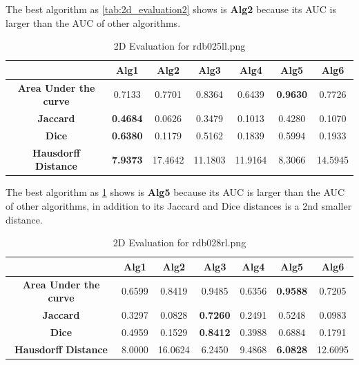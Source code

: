 \documentclass[a4paper, 11pt]{article}
\begin{document}
The best algorithm as \ref{tab:2d_evaluation2} shows is \textbf{Alg2} because its AUC is larger than the AUC of other algorithms.

\begin{table}[h!]
\centering
\begin{tabular}{|c|c|c|c|c|c|c|}
\hline
{} & \textbf{Alg1} & \textbf{Alg2} & \textbf{Alg3} & \textbf{Alg4} & \textbf{Alg5} & \textbf{Alg6} \\
\hline
\textbf{Area Under the curve} & {0.7133} & {0.7701} & {0.8364} & {0.6439} & \textbf{0.9630} & {0.7726} \\
\hline
\textbf{Jaccard} & \textbf{0.4684} & {0.0626} & {0.3479} & {0.1013} & {0.4280} & {0.1070} \\
\hline
\textbf{Dice} & \textbf{0.6380} & {0.1179} & {0.5162} & {0.1839} & {0.5994} & {0.1933} \\
\hline
\textbf{Hausdorff Distance} & \textbf{7.9373} & {17.4642} & {11.1803} & {11.9164} & {8.3066} & {14.5945} \\
\hline
\end{tabular}
\caption{\label{tab:2d_evaluation3} 2D Evaluation for rdb025ll.png} 
\end{table}

The best algorithm as \ref{tab:2d_evaluation3} shows is \textbf{Alg5} because its AUC is larger than the AUC of other algorithms, in addition to its Jaccard and Dice distances is a 2nd smaller distance.
 

\begin{table}[h!]
\centering
\begin{tabular}{|c|c|c|c|c|c|c|}
\hline
{} & \textbf{Alg1} & \textbf{Alg2} & \textbf{Alg3} & \textbf{Alg4} & \textbf{Alg5} & \textbf{Alg6} \\
\hline
\textbf{Area Under the curve} & {0.6599} & {0.8419} & {0.9485} & {0.6356} & \textbf{0.9588} & {0.7205} \\
\hline
\textbf{Jaccard} & {0.3297} & {0.0828} & \textbf{0.7260} & {0.2491} & {0.5248} & {0.0983} \\
\hline
\textbf{Dice} & {0.4959} & {0.1529} & \textbf{0.8412} & {0.3988} & {0.6884} & {0.1791} \\
\hline
\textbf{Hausdorff Distance} & {8.0000} & {16.0624} & {6.2450} & {9.4868} & \textbf{6.0828} & {12.6095} \\
\hline
\end{tabular}
\caption{\label{tab:2d_evaluation4} 2D Evaluation for rdb028rl.png}
\end{table}
\end{document}
